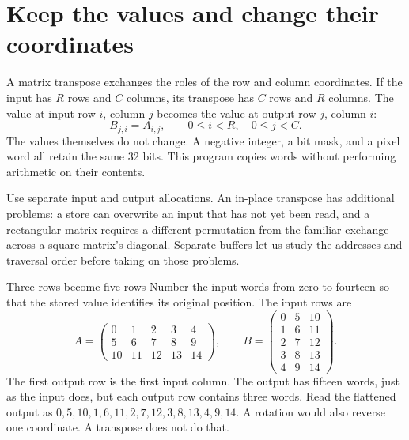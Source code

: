 \section{Keep the values and change their coordinates}
A matrix transpose exchanges the roles of the row and column coordinates. If the
input has \(R\) rows and \(C\) columns, its transpose has \(C\) rows and \(R\)
columns. The value at input row \(i\), column \(j\) becomes the value at output
row \(j\), column \(i\):
\[
  B_{j,i}=A_{i,j},\qquad 0\leq i<R,\quad 0\leq j<C.
\]
The values themselves do not change. A negative integer, a bit mask, and a pixel
word all retain the same 32 bits. This program copies words without performing
arithmetic on their contents.

Use separate input and output allocations. An in-place transpose has additional
problems: a store can overwrite an input that has not yet been read, and a
rectangular matrix requires a different permutation from the familiar exchange
across a square matrix's diagonal. Separate buffers let us study the addresses
and traversal order before taking on those problems.

\begin{MARSWorkedExample}{Three rows become five rows}
  Number the input words from zero to fourteen so that the stored value identifies
  its original position. The input rows are
  \[
    A=\begin{pmatrix}
      0  & 1  & 2  & 3  & 4  \\
      5  & 6  & 7  & 8  & 9  \\
      10 & 11 & 12 & 13 & 14
    \end{pmatrix},\qquad
    B=\begin{pmatrix}
      0 & 5 & 10 \\
      1 & 6 & 11 \\
      2 & 7 & 12 \\
      3 & 8 & 13 \\
      4 & 9 & 14
    \end{pmatrix}.
  \]
  The first output row is the first input column. The output has fifteen words,
  just as the input does, but each output row contains three words. Read the
  flattened output as \(0,5,10,1,6,11,2,7,12,3,8,13,4,9,14\).
  A rotation would also reverse one coordinate. A transpose does not do that.
\end{MARSWorkedExample}

